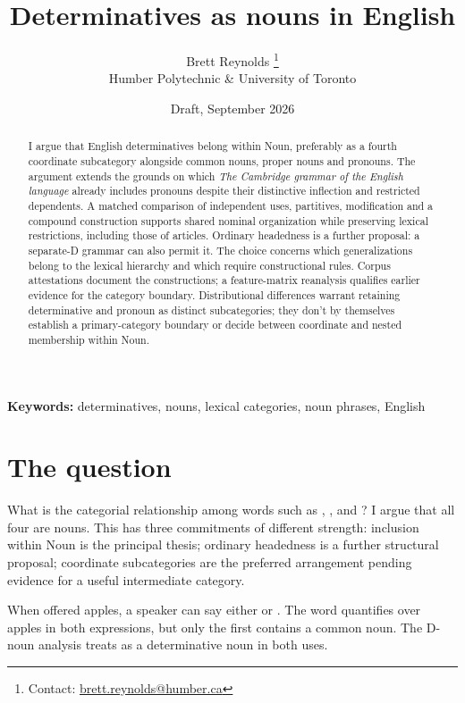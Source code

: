 \documentclass[12pt]{article}
\title{Determinatives as nouns in English}
\author{Brett Reynolds \orcidlink{0000-0003-0073-7195}%
\thanks{Contact: \href{mailto:brett.reynolds@humber.ca}{brett.reynolds@humber.ca}}\\
Humber Polytechnic \& University of Toronto}
\date{Draft, September 2026}
\begin{document}
\maketitle

\begin{abstract}
I argue that English determinatives belong within Noun, preferably as a fourth coordinate subcategory alongside common nouns, proper nouns and pronouns. The argument extends the grounds on which \textit{The Cambridge grammar of the English language} already includes pronouns despite their distinctive inflection and restricted dependents. A matched comparison of independent uses, partitives, modification and a compound construction supports shared nominal organization while preserving lexical restrictions, including those of articles. Ordinary headedness is a further proposal: a separate-D grammar can also permit it. The choice concerns which generalizations belong to the lexical hierarchy and which require constructional rules. Corpus attestations document the constructions; a feature-matrix reanalysis qualifies earlier evidence for the category boundary. Distributional differences warrant retaining determinative and pronoun as distinct subcategories; they don't by themselves establish a primary-category boundary or decide between coordinate and nested membership within Noun.
\end{abstract}

\noindent\textbf{Keywords:} determinatives, nouns, lexical categories, noun phrases, English

\section{The question}\label{sec:intro}

What is the categorial relationship among words such as , ,  and ? I argue that all four are nouns. This  has three commitments of different strength: inclusion within Noun is the principal thesis; ordinary headedness is a further structural proposal; coordinate subcategories are the preferred arrangement pending evidence for a useful intermediate category.

When offered apples, a speaker can say either  or . The word  quantifies over apples in both expressions, but only the first contains a common noun. The D-noun analysis treats  as a determinative noun in both uses.
\end{document}
